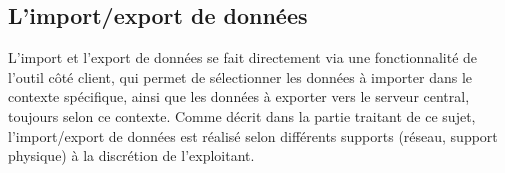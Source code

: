 \subsection{L'import/export de données}
L'import et l'export de données se fait directement via une fonctionnalité de l'outil côté client, qui permet de sélectionner les données à importer dans le contexte spécifique, ainsi que les données à exporter vers le serveur central, toujours selon ce contexte.
Comme décrit dans la partie traitant de ce sujet, l'import/export de données est réalisé selon différents supports (réseau, support physique) à la discrétion de l'exploitant.

